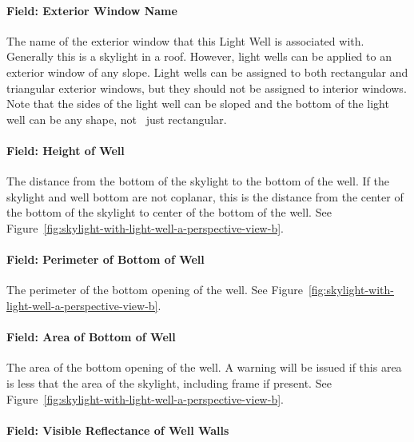 \paragraph{Field: Exterior Window Name}\label{field-exterior-window-name}

The name of the exterior window that this Light Well is associated with. Generally this is a skylight in a roof. However, light wells can be applied to an exterior window of any slope. Light wells can be assigned to both rectangular and triangular exterior windows, but they should not be assigned to interior windows. Note that the sides of the light well can be sloped and the bottom of the light well can be any shape, not~ just rectangular.

\paragraph{Field: Height of Well}\label{field-height-of-well}

The distance from the bottom of the skylight to the bottom of the well. If the skylight and well bottom are not coplanar, this is the distance from the center of the bottom of the skylight to center of the bottom of the well. See Figure~\ref{fig:skylight-with-light-well-a-perspective-view-b}.

\paragraph{Field: Perimeter of Bottom of Well}\label{field-perimeter-of-bottom-of-well}

The perimeter of the bottom opening of the well. See Figure~\ref{fig:skylight-with-light-well-a-perspective-view-b}.

\paragraph{Field: Area of Bottom of Well}\label{field-area-of-bottom-of-well}

The area of the bottom opening of the well. A warning will be issued if this area is less that the area of the skylight, including frame if present. See Figure~\ref{fig:skylight-with-light-well-a-perspective-view-b}.

\paragraph{Field: Visible Reflectance of Well Walls}\label{field-visible-reflectance-of-well-walls}

